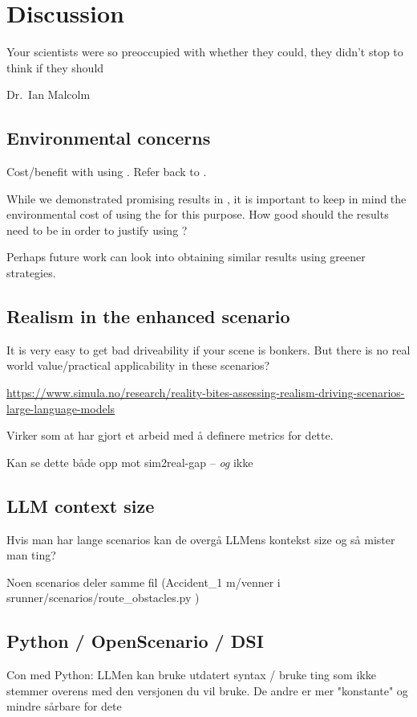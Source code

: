 
\chapter{Discussion}

\epigraph{Your scientists were so preoccupied with whether they could, they didn't stop to think if they should}{Dr.~Ian Malcolm}


\section{Environmental concerns}
Cost/benefit with using . Refer back to .

While we demonstrated promising results in , it is important to keep in mind the
environmental cost of using the  for this purpose. How good should the results need
to be in order to justify using ?

Perhaps future work can look into obtaining similar results using greener strategies.

\section{Realism in the enhanced scenario}

It is very easy to get bad driveability if your scene is bonkers. But there is no real world
value/practical applicability in these scenarios?

\url{https://www.simula.no/research/reality-bites-assessing-realism-driving-scenarios-large-language-models}

Virker som at \cite{LLMScenarioChang24} har gjort et arbeid med å definere metrics for dette.

Kan se dette både opp mot sim2real-gap -- \emph{og} ikke


\section{LLM context size}

Hvis man har lange scenarios kan de overgå LLMens kontekst size og så mister man ting?

Noen scenarios deler samme fil (Accident\_1 m/venner i srunner/scenarios/route\_obstacles.py )

\section{Python / OpenScenario / DSI}

Con med Python: LLMen kan bruke utdatert syntax / bruke ting som ikke stemmer overens med den
versjonen du vil bruke. De andre er mer "konstante" og mindre sårbare for dete
